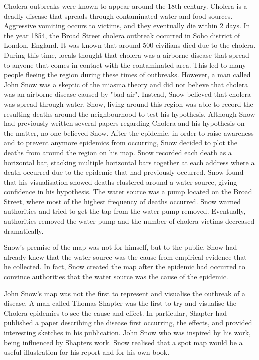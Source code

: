 \documentclass[12pt]{article}
\begin{document}
Cholera outbreaks were known to appear around the 18th century. Cholera is a deadly disease that spreads through contaminated water and food sources. Aggressive vomiting occurs to victims, and they eventually die within 2 days. In the year 1854, the Broad Street cholera outbreak occurred in Soho district of London, England. It was known that around 500 civilians died due to the cholera. During this time, locals thought that cholera was a airborne disease that spread to anyone that comes in contact with the contaminated area. This led to many people fleeing the region during these times of outbreaks. However, a man called John Snow was a skeptic of the miasma theory and did not believe that cholera was an airborne disease caused by "bad air". Instead, Snow believed that cholera was spread through water. Snow, living around this region was able to record the resulting deaths around the neighbourhood to test his hypothesis. Although Snow had previously written several papers regarding Cholera and his hypothesis on the matter, no one believed Snow. After the epidemic, in order to raise awareness and to prevent anymore epidemics from occurring, Snow decided to plot the deaths from around the region on his map. Snow recorded each death as a horizontal bar, stacking multiple horizontal bars together at each address where a death occurred due to the epidemic that had previously occurred. Snow found that his visualisation showed deaths clustered around a water source, giving confidence in his hypothesis. The water source was a pump located on the Broad Street, where most of the highest frequency of deaths occurred. Snow warned authorities and tried to get the tap from the water pump removed. Eventually, authorities removed the water pump and the number of cholera victims decreased dramatically. 

Snow's premise of the map was not for himself, but to the public. Snow had already knew that the water source was the cause from empirical evidence that he collected. In fact, Snow created the map after the epidemic had occurred to convince authorities that the water source was the cause of the epidemic.  

John Snow's map was not the first to represent and visualise the outbreak of a disease. A man called Thomas Shapter was the first to try and visualise the Cholera epidemics to see the cause and effect. In particular, Shapter had published a paper describing the disease first occurring, the effects, and provided interesting sketches in his publication. John Snow who was inspired by his work, being influenced by Shapters work. Snow realised that a spot map would be a useful illustration for his report and for his own book.  
\end{document}
